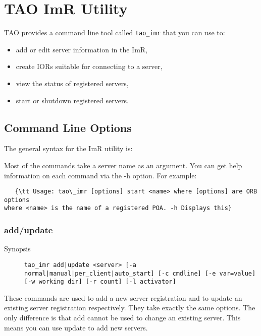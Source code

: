 \section{TAO ImR Utility}
\label{taoimrutil}

TAO provides a command line tool called {\tt tao\_imr} that you can use to:

\begin{itemize}
    \item add or edit server information in the ImR,
    \item create IORs suitable for connecting to a server,
    \item view the status of registered servers,
    \item start or shutdown registered servers.
\end{itemize}

\subsection{Command Line Options}

The general syntax for the ImR utility is:


Most of the commands take a server name as an argument. You can get help
information on each command via the -h option. For example:


\begin{verbatim}
   {\tt Usage: tao\_imr [options] start <name> where [options] are ORB options
where <name> is the name of a registered POA. -h Displays this}
\end{verbatim}

\subsubsection{add/update}

\begin{description}
    \item [Synopsis] {\tt tao\_imr add|update <server>
                 [-a normal|manual|per\_client|auto\_start] [-c cmdline]
                 [-e var=value] [-w working dir] [-r count] [-l activator]}
\end{description}

These commands are used to add a new server registration and to update
an existing server registration respectively. They take exactly the same
options. The only difference is that add cannot be used to change an
existing server. This means you can use update to add new servers.

